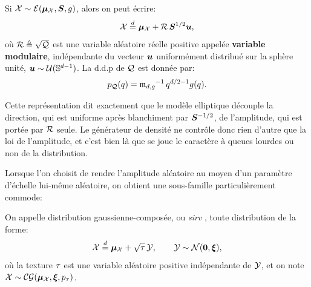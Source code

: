 \begin{property}
\label{prop:context-distributions-stochastic}
  Si $\mathcal{X}\sim\mathcal{E}(\boldsymbol{\mu}_{\mathcal{X}},\boldsymbol{S},g)$, alors on peut écrire:
  \begin{equation}
    \mathcal{X}
    \overset{d}{=}
    \boldsymbol{\mu}_{\mathcal{X}} + \mathcal{R}\,\boldsymbol{S}^{1/2}\boldsymbol{u},
    \label{eq:context-distributions-stochastic}
  \end{equation}
  où $\mathcal{R}\triangleq\sqrt{\mathcal{Q}}$ est une variable aléatoire réelle positive appelée \textbf{variable modulaire}, indépendante du vecteur $\boldsymbol{u}$ uniformément distribué sur la sphère unité, $\boldsymbol{u}\sim\mathcal{U}(\mathbb{S}^{d-1})$. La d.d.p de $\mathcal{Q}$ est donnée par:
  \begin{equation}
    p_{\mathcal{Q}}(q) = {\mathfrak{m}_{d,g}}^{-1}\,q^{d/2-1}g(q).
    \label{eq:context-distributions-modularpdf}
  \end{equation}
\end{property}

\begin{remark}
  Cette représentation dit exactement que le modèle elliptique découple la direction, qui est uniforme après blanchiment par $\boldsymbol{S}^{-1/2}$, de l'amplitude, qui est portée par $\mathcal{R}$ seule. Le générateur de densité ne contrôle donc rien d'autre que la loi de l'amplitude, et c'est bien là que se joue le caractère à queues lourdes ou non de la distribution.
\end{remark}

Lorsque l'on choisit de rendre l'amplitude aléatoire au moyen d'un paramètre d'échelle lui-même aléatoire, on obtient une sous-famille particulièrement commode:

\begin{definition}
\label{def:context-distributions-compoundgaussian}
  On appelle distribution gaussienne-composée, ou \textit{sirv} , toute distribution de la forme:
\begin{equation}
  \mathcal{X}
  \overset{d}{=}
  \boldsymbol{\mu}_{\mathcal{X}} + \sqrt{\tau}\,\mathcal{Y},
  \qquad
  \mathcal{Y}\sim\mathcal{N}(\boldsymbol{0},\boldsymbol{\xi}),
  \label{eq:context-distributions-compoundgaussian}
\end{equation}
  où la texture $\tau$ est une variable aléatoire positive indépendante de $\mathcal{Y}$, et on note $\mathcal{X}\sim\mathcal{CG}(\boldsymbol{\mu}_{\mathcal{X}},\boldsymbol{\xi},p_{\tau})$.
\end{definition}

